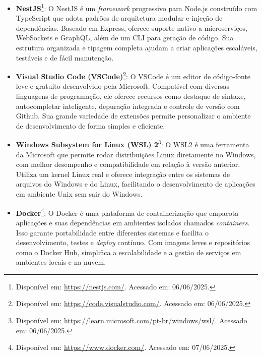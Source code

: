 \begin{enumerate}
\begin{itemize}
            \item \textbf{NestJS}\footnote{Disponível em: \url{https://nestjs.com/}. Acessado em: 06/06/2025.}: 
                O NestJS é um \textit{framework} progressivo para Node.js construído com TypeScript que adota padrões de arquitetura modular e injeção de dependências. Baseado em Express, oferece suporte nativo a microserviços, WebSockets e GraphQL, além de um CLI para geração de código. Sua estrutura organizada e tipagem completa ajudam a criar aplicações escaláveis, testáveis e de fácil manutenção. %
            \par\vspace{0.25\baselineskip}
            
            \item \textbf{Visual Studio Code (VSCode)}\footnote{Disponível em: \url{https://code.visualstudio.com/}. Acessado em: 06/06/2025.}:
                O VSCode é um editor de código‐fonte leve e gratuito desenvolvido pela Microsoft. Compatível com diversas linguagens de programação, ele oferece recursos como destaque de sintaxe, autocompletar inteligente, depuração integrada e controle de versão com Github. Sua grande variedade de extensões permite personalizar o ambiente de desenvolvimento de forma simples e eficiente.
            \par\vspace{0.25\baselineskip}

            \item \textbf{Windows Subsystem for Linux (WSL) 2}\footnote{Disponível em: \url{https://learn.microsoft.com/pt-br/windows/wsl/}. Acessado em: 06/06/2025.}: 
                O WSL2 é uma ferramenta da Microsoft que permite rodar distribuições Linux diretamente no Windows, com melhor desempenho e compatibilidade em relação à versão anterior. Utiliza um kernel Linux real e oferece integração entre os sistemas de arquivos do Windows e do Linux, facilitando o desenvolvimento de aplicações em ambiente Unix sem sair do Windows. %
            \par\vspace{0.25\baselineskip}

            \item \textbf{Docker}\footnote{Disponível em: \url{https://www.docker.com/}. Acessado em: 07/06/2025.}: 
                O Docker é uma plataforma de containerização que empacota aplicações e suas dependências em ambientes isolados chamados \textit{containers}. Isso garante portabilidade entre diferentes sistemas e facilita o desenvolvimento, testes e \textit{deploy} contínuo. Com imagens leves e repositórios como o Docker Hub, simplifica a escalabilidade e a gestão de serviços em ambientes locais e na nuvem. %
             \par\vspace{0.25\baselineskip}


\end{itemize}
\end{enumerate}
